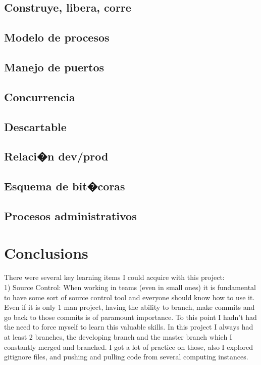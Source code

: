 \documentclass[10pt]{article}
\begin{document}
 \subsection{Construye, libera, corre}
 \subsection{Modelo de procesos}
 \subsection{Manejo de puertos}
 \subsection{Concurrencia}
 \subsection{Descartable}
 \subsection{Relaci�n dev/prod}
 \subsection{Esquema de bit�coras}
 \subsection{Procesos administrativos}
\section{Conclusions}
There were several key learning items I could acquire with this project:\\

1) Source Control: When working in teams (even in small ones) it is fundamental to have some sort of source control tool and everyone should know how to use it. Even if it is only 1 man project, having the ability to branch, make commits and go back to those commits is of paramount importance. To this point I hadn't had the need to force myself to learn this valuable skills. In this project I always had at least 2 branches, the developing branch and the master branch which I constantly merged and branched. I got a lot of practice on those, also I explored gitignore files, and pushing and pulling code from several computing instances.\\
\end{document}
